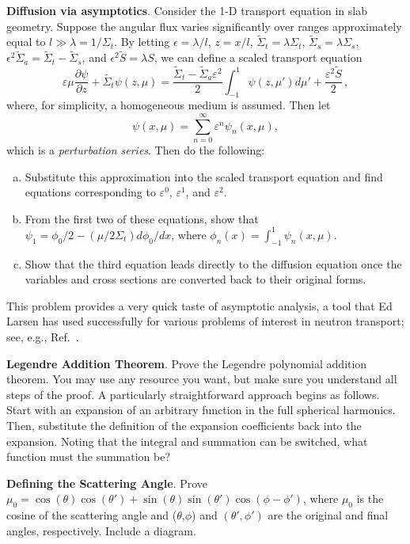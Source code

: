 \begin{exercises}
  \item \textbf{Diffusion via asymptotics}.  
  Consider the 1-D transport equation in slab geometry.  
  Suppose the angular flux varies significantly over ranges 
  approximately equal to $l \gg \lambda = 1/\Sigma_t$.  
  By letting
  $\epsilon = \lambda / l$, $z=x/l$, $\tilde{\Sigma}_t = \lambda \Sigma_t$,
  $\tilde{\Sigma}_s = \lambda \Sigma_s$, 
  $\epsilon^2 \tilde{\Sigma}_a = \tilde{\Sigma}_t-\tilde{\Sigma}_s$,
  and $\epsilon^2 \tilde{S} = \lambda S$, we can define
  a scaled transport equation
  \begin{equation}
   \varepsilon \mu \frac{\partial \psi}{\partial z} 
     + \tilde{\Sigma_t} \psi(z,\mu) = 
     \frac{\tilde{\Sigma}_t - \tilde{\Sigma}_a \varepsilon^2}{2} \int^1_{-1} \psi(z,\mu')d\mu '
     + \frac{\varepsilon^2 \tilde{S}}{2} \, ,
  \end{equation}
  where, for simplicity, a homogeneous medium is assumed.  Then let
\begin{equation}
  \psi(x, \mu) = \sum^{\infty}_{n=0} \varepsilon^n \psi_n(x,\mu) ,
\end{equation}
which is a \emph{perturbation series}.  Then do the following:
\begin{enumerate}[(a)]
 \item Substitute this approximation into the scaled transport equation and 
       find equations corresponding to $\varepsilon^0$, $\varepsilon^1$, 
       and $\varepsilon^2$.
 \item From the first two of these equations, 
       show that $\psi_1 = \phi_0/2 - (\mu/2\Sigma_t)d\phi_0/dx$, where 
       $\phi_n(x) = \int^1_{-1} \psi_n(x,\mu)$.
 \item Show that the third equation leads directly to the diffusion 
       equation once the variables and cross sections 
       are converted back to their original forms.       
\end{enumerate}
This problem provides a very quick taste of asymptotic analysis, a 
tool that Ed Larsen has used successfully for various problems of interest in
neutron transport; see, e.g., Ref.~\cite{larsen2009aan}.


  \item \textbf{Legendre Addition Theorem}. Prove the Legendre polynomial 
addition theorem.  You may use any resource you want, but make sure you 
understand all steps of the proof.  A particularly straightforward approach 
begins as follows.  Start with an expansion of an arbitrary function in the full 
spherical harmonics.  Then, substitute the definition of the expansion 
coefficients back into the expansion.  Noting that the integral and summation 
can be switched, what function must the summation be?  

  \item \textbf{Defining the Scattering Angle}. Prove $\mu_0 = 
\cos(\theta)\cos(\theta')+\sin(\theta)\sin(\theta')\cos(\phi-\phi')$, where 
$\mu_0$ is the cosine of the scattering angle and ($\theta$,$\phi$) and 
$(\theta',\phi')$ are the original and final angles, respectively.  Include a 
diagram.

\end{exercises}
